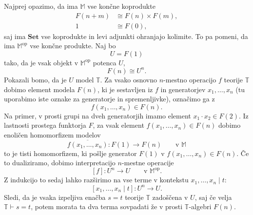 \documentclass[../kategoricna_logika.tex]{subfiles}
\begin{document}
\begin{dokaz}
   Najprej opazimo, da ima $\mathbb{M}$ vse končne
  koprodukte
  \begin{align*}
    F(n + m) &\cong F(n) \times F(m), \\
    1 &\cong F(0),
  \end{align*}
  saj ima $\mathbf{Set}$ vse koprodukte in levi adjunkti ohranjajo kolimite.
  To pa pomeni, da ima $\mathbb{M}^{\mathrm{op}}$ vse končne produkte. Naj bo
  \[ U = F(1) \]
  tako, da je vsak objekt v $\mathbb{M}^{\mathrm{op}}$ potenca $U$,
  \[ F(n) \cong U^n.\]
  Pokazali bomo, da je $U$ model $\mathbb{T}$.
  Za vsako osnovno $n$-mestno operacijo $f$ teorije $\mathbb{T}$ dobimo element modela
  $F(n)$, ki je sestavljen iz $f$ in generatorjev $x_1, \ldots, x_n$ (tu uporabimo
  iste oznake za generatorje in spremenljivke), označimo ga z
  \[ f(x_1, \ldots, x_n) \in F(n).\]
  Na primer, v prosti grupi na dveh generatorjih imamo element $x_1 \cdot x_2 \in F(2)$.
  Iz lastnosti prostega funktorja $F$, za vsak element $f(x_1, \ldots, x_n) \in F(n)$
  dobimo enoličen homomorfizem modelov
  \[ \overline{f(x_1, \ldots, x_n)} : F(1) \to F(n) \qquad \text{v $\mathbb{M}$}\]
  to je tisti homomorfizem, ki pošlje generator $F(1)$ v $f(x_1, \ldots, x_n) \in F(n)$.
  Če to dualiziramo, dobimo interpretacijo $n$-mestne operacije
  \[ [f] : U^n \to U \qquad \text{v $\mathbb{M}^{\mathrm{op}}$}.\]
  Z indukcijo to sedaj lahko razširimo na vse terme v kontekstu $x_1, \ldots, x_n \mid t$:
  \[ [x_{1}, \ldots, x_n \mid t] : U^n \to U.\]
  Sledi, da je vsaka izpeljiva enačba $s = t$ teorije $\mathbb{T}$ zadoščena v $U$,
  saj če velja $\mathbb{T} \vdash s = t$, potem morata ta dva terma sovpadati
  že v prosti $\mathbb{T}$-algebri $F(n)$.


\end{dokaz}
\end{document}
